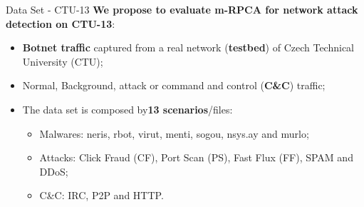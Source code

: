 \documentclass[newPxFont, numfooter, sectionpages]{beamer}
\begin{document}



\begin{frame}[c]{Data Set - CTU-13}
    \textbf{We propose to evaluate m-RPCA for network attack detection on CTU-13}:
    \begin{itemize}
    	\item \textbf{Botnet traffic} captured from a real network (\textbf{testbed}) of Czech Technical University (CTU);
    	\item Normal, Background, attack or command and control (\textbf{C\&C}) traffic;
        \item The data set is composed by\textbf{13 scenarios}/files:
            \begin{itemize}
                \item Malwares: neris, rbot, virut, menti, sogou, nsys.ay and murlo;	
            	\item Attacks: Click Fraud (CF), Port Scan (PS), Fast Flux (FF), SPAM and DDoS;
            	\item C\&C: IRC, P2P and HTTP.
            \end{itemize}
    \end{itemize}
\end{frame}
\end{document}

